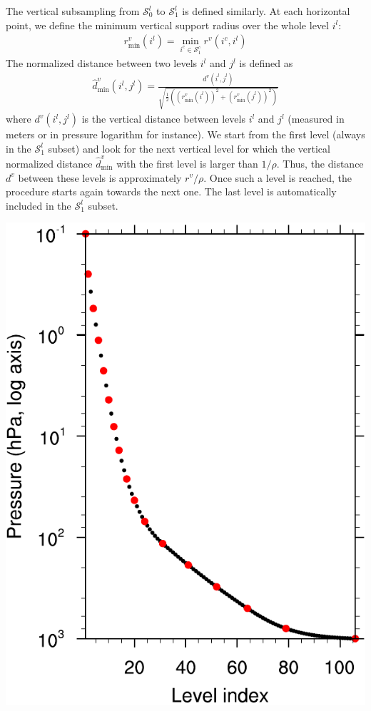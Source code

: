 \documentclass[12pt]{scrartcl}
\begin{document}
The vertical subsampling from $\mathcal{S}^l_0$ to $\mathcal{S}^l_1$ is defined similarly. At each horizontal point, we define the minimum vertical support radius over the whole level $i^l$:
\begin{align}
r^v_\mathrm{min}(i^l) = \min_{i^c \in \mathcal{S}^c_1} r^v(i^c,i^l)
\end{align}
The normalized distance between two levels $i^l$ and $j^l$ is defined as
\begin{align}
\widehat{d}^v_\text{min}(i^l,j^l) = \frac{d^v(i^l,j^l)}{\displaystyle \sqrt{\frac{1}{2}\left(\left(r^v_\mathrm{min}(i^l)\right)^2+\left(r^v_\mathrm{min}(j^l)\right)^2\right)}}
\end{align}
where $d^v(i^l,j^l)$ is the vertical distance between levels $i^l$ and $j^l$ (measured in meters or in pressure logarithm for instance). We start from the first level (always in the $\mathcal{S}^l_1$ subset) and look for the next vertical level for which the vertical normalized distance $\widehat{d}^v_\text{min}$ with the first level is larger than $1/\rho$. Thus, the distance $d^v$ between these levels is approximately $r^v/\rho$. Once such a level is reached, the procedure starts again towards the next one. The last level is automatically included in the $\mathcal{S}^l_1$ subset.
 
\begin{center}
\includegraphics[height=0.6\linewidth]{profile.pdf}
\end{center}
\end{document}
